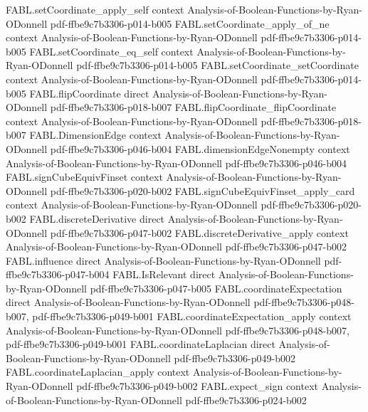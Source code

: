 \begin{theorem}
\proofstep
  {FABL.setCoordinate_apply_self}
  {context}
  {Analysis-of-Boolean-Functions-by-Ryan-ODonnell}
  {pdf-ffbe9c7b3306-p014-b005}
\proofstep
  {FABL.setCoordinate_apply_of_ne}
  {context}
  {Analysis-of-Boolean-Functions-by-Ryan-ODonnell}
  {pdf-ffbe9c7b3306-p014-b005}
\proofstep
  {FABL.setCoordinate_eq_self}
  {context}
  {Analysis-of-Boolean-Functions-by-Ryan-ODonnell}
  {pdf-ffbe9c7b3306-p014-b005}
\proofstep
  {FABL.setCoordinate_setCoordinate}
  {context}
  {Analysis-of-Boolean-Functions-by-Ryan-ODonnell}
  {pdf-ffbe9c7b3306-p014-b005}
\proofstep
  {FABL.flipCoordinate}
  {direct}
  {Analysis-of-Boolean-Functions-by-Ryan-ODonnell}
  {pdf-ffbe9c7b3306-p018-b007}
\proofstep
  {FABL.flipCoordinate_flipCoordinate}
  {context}
  {Analysis-of-Boolean-Functions-by-Ryan-ODonnell}
  {pdf-ffbe9c7b3306-p018-b007}
\proofstep
  {FABL.DimensionEdge}
  {context}
  {Analysis-of-Boolean-Functions-by-Ryan-ODonnell}
  {pdf-ffbe9c7b3306-p046-b004}
\proofstep
  {FABL.dimensionEdgeNonempty}
  {context}
  {Analysis-of-Boolean-Functions-by-Ryan-ODonnell}
  {pdf-ffbe9c7b3306-p046-b004}
\proofstep
  {FABL.signCubeEquivFinset}
  {context}
  {Analysis-of-Boolean-Functions-by-Ryan-ODonnell}
  {pdf-ffbe9c7b3306-p020-b002}
\proofstep
  {FABL.signCubeEquivFinset_apply_card}
  {context}
  {Analysis-of-Boolean-Functions-by-Ryan-ODonnell}
  {pdf-ffbe9c7b3306-p020-b002}
\proofstep
  {FABL.discreteDerivative}
  {direct}
  {Analysis-of-Boolean-Functions-by-Ryan-ODonnell}
  {pdf-ffbe9c7b3306-p047-b002}
\proofstep
  {FABL.discreteDerivative_apply}
  {context}
  {Analysis-of-Boolean-Functions-by-Ryan-ODonnell}
  {pdf-ffbe9c7b3306-p047-b002}
\proofstep
  {FABL.influence}
  {direct}
  {Analysis-of-Boolean-Functions-by-Ryan-ODonnell}
  {pdf-ffbe9c7b3306-p047-b004}
\proofstep
  {FABL.IsRelevant}
  {direct}
  {Analysis-of-Boolean-Functions-by-Ryan-ODonnell}
  {pdf-ffbe9c7b3306-p047-b005}
\proofstep
  {FABL.coordinateExpectation}
  {direct}
  {Analysis-of-Boolean-Functions-by-Ryan-ODonnell}
  {pdf-ffbe9c7b3306-p048-b007,
    pdf-ffbe9c7b3306-p049-b001}
\proofstep
  {FABL.coordinateExpectation_apply}
  {context}
  {Analysis-of-Boolean-Functions-by-Ryan-ODonnell}
  {pdf-ffbe9c7b3306-p048-b007,
    pdf-ffbe9c7b3306-p049-b001}
\proofstep
  {FABL.coordinateLaplacian}
  {direct}
  {Analysis-of-Boolean-Functions-by-Ryan-ODonnell}
  {pdf-ffbe9c7b3306-p049-b002}
\proofstep
  {FABL.coordinateLaplacian_apply}
  {context}
  {Analysis-of-Boolean-Functions-by-Ryan-ODonnell}
  {pdf-ffbe9c7b3306-p049-b002}
\proofstep
  {FABL.expect_sign}
  {context}
  {Analysis-of-Boolean-Functions-by-Ryan-ODonnell}
  {pdf-ffbe9c7b3306-p024-b002}

\end{theorem}
